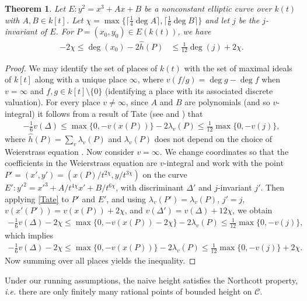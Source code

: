 \documentclass[11pt]{article}
\theoremstyle{plain}
\newtheorem{theorem}{Theorem}[section]
\theoremstyle{definition}
\begin{document}
\begin{theorem}
\label{comparison}
Let $E:y^2=x^3+Ax+B$ be a nonconstant elliptic curve over $k(t)$ with $A,B\in k[t]$. Let $\chi=\max\{\lceil\frac{1}{4}\deg A\rceil, \lceil\frac{1}{6}\deg B\rceil\}$ and let $j$ be the $j$-invariant of $E$. For $P=(x_0,y_0)\in E(k(t))$, we have
\begin{align*}
-2\chi\leq \deg(x_0)-2\hat{h}(P)&\leq \frac{1}{12}\deg(j)+2\chi.
\end{align*}
\end{theorem}

\begin{proof}
We may identify the set of places of $k(t)$ with the set of maximal ideals of $k[t]$ along with a unique place $\infty$, where $v(f/g)=\deg g-\deg f$ when $v=\infty$ and $f,g\in k[t]\setminus\{0\}$ (identifying a place with its associated discrete valuation).  For every place $v\neq\infty$, since $A$ and $B$ are polynomials (and so $v$-integral) it follows from a result of Tate (see \cite[Theorem~4.5]{Lang78} and \cite[Theorem~4.1]{Sil90}) that
\begin{align}
\label{Tate}
-\frac{1}{6}v(\Delta)\leq \max\{0,-v(x(P))\}-2\lambda_v(P)\leq \frac{1}{12}\max\{0, -v(j)\},
\end{align}
where $\hat{h}(P)=\sum_v \lambda_v(P)$ and $\lambda_v(P)$ does not depend on the choice of Weierstrass equation \cite[p.~64]{Lang78}. Now consider $v=\infty$. We change coordinates so that the coefficients in the Weierstrass equation are $v$-integral and work with the point $P'=(x',y')=(x(P)/t^{2\chi},y/t^{3\chi})$ on the curve $E':y'^2=x'^3+A/t^{4\chi}x'+B/t^{6\chi}$, with discriminant $\Delta'$ and $j$-invariant $j'$. Then applying \eqref{Tate} to $P'$ and $E'$, and using $\lambda_v(P')=\lambda_v(P)$, $j'=j$, $v(x'(P'))=v(x(P))+2\chi$, and $v(\Delta')=v(\Delta)+12\chi$, we obtain
\begin{align*}
-\frac{1}{6}v(\Delta)-2\chi\leq \max\{0,-v(x(P))-2\chi\}-2\lambda_v(P)\leq \frac{1}{12}\max\{0, -v(j)\},
\end{align*}
which implies
\begin{align*}
-\frac{1}{6}v(\Delta)-2\chi\leq \max\{0,-v(x(P))\}-2\lambda_v(P)\leq \frac{1}{12}\max\{0, -v(j)\}+2\chi.
\end{align*}
Now summing over all places yields the inequality. 
\end{proof}


Under our running assumptions, the naive height satisfies the Northcott property, \emph{i.e.} there are only finitely many rational points of bounded height on $\mathcal{C}$.
\end{document}
